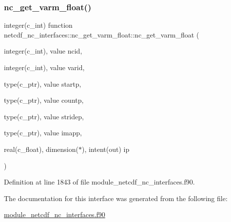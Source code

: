 \subsubsection{\texorpdfstring{nc\+\_\+get\+\_\+varm\+\_\+float()}{nc\_get\_varm\_float()}}
{\footnotesize\ttfamily integer(c\+\_\+int) function netcdf\+\_\+nc\+\_\+interfaces\+::nc\+\_\+get\+\_\+varm\+\_\+float\+::nc\+\_\+get\+\_\+varm\+\_\+float (\begin{DoxyParamCaption}\item[{integer(c\+\_\+int), value}]{ncid,  }\item[{integer(c\+\_\+int), value}]{varid,  }\item[{type(c\+\_\+ptr), value}]{startp,  }\item[{type(c\+\_\+ptr), value}]{countp,  }\item[{type(c\+\_\+ptr), value}]{stridep,  }\item[{type(c\+\_\+ptr), value}]{imapp,  }\item[{real(c\+\_\+float), dimension($\ast$), intent(out)}]{ip }\end{DoxyParamCaption})}



Definition at line 1843 of file module\+\_\+netcdf\+\_\+nc\+\_\+interfaces.\+f90.



The documentation for this interface was generated from the following file\+:\begin{DoxyCompactItemize}
\item 
\hyperlink{module__netcdf__nc__interfaces_8f90}{module\+\_\+netcdf\+\_\+nc\+\_\+interfaces.\+f90}\end{DoxyCompactItemize}
